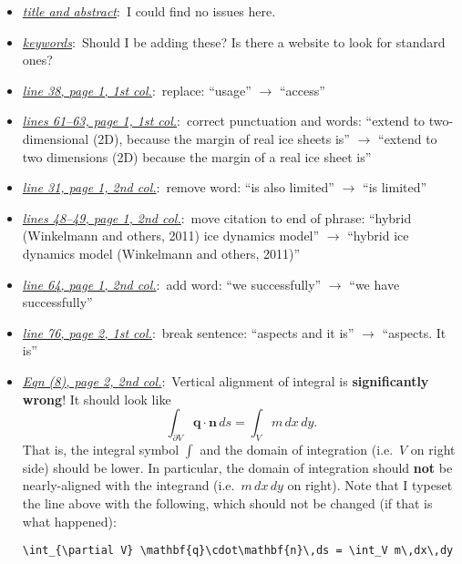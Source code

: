 \documentclass[11pt,reqno]{amsart}
\newcommand{\comm}[2]{\medskip \item[] \hspace{-0.5in}\underline{\emph{#1}}:\, #2}
\newcommand{\lnpagecol}[4]{\comm{line #1, page #2, #3 col.}{#4}}
\newcommand{\lnspagecol}[4]{\comm{lines #1, page #2, #3 col.}{#4}}
\newcommand{\eqnpagecol}[4]{\comm{Eqn #1, page #2, #3 col.}{#4}}
\begin{document}
\begin{itemize}
\comm{title and abstract}{I could find no issues here.}
\comm{keywords}{Should I be adding these?  Is there a website to look for standard ones?}
\lnpagecol{38}{1}{1st}{replace: ``usage'' $\to$ ``access''}
\lnspagecol{61--63}{1}{1st}{correct punctuation and words: ``extend to two-dimensional (2D), because the margin of real ice sheets is'' $\to$ ``extend to two dimensions (2D) because the margin of a real ice sheet is''}
\lnpagecol{31}{1}{2nd}{remove word:  ``is also limited'' $\to$ ``is limited''}
\lnspagecol{48--49}{1}{2nd}{move citation to end of phrase:  ``hybrid (Winkelmann and others, 2011) ice dynamics model'' $\to$ ``hybrid ice dynamics model (Winkelmann and others, 2011)''}
\lnpagecol{64}{1}{2nd}{add word: ``we successfully'' $\to$ ``we have successfully''}
\lnpagecol{76}{2}{1st}{break sentence: ``aspects and it is'' $\to$ ``aspects.  It is''}
\eqnpagecol{(8)}{2}{2nd}{Vertical alignment of integral is \textbf{significantly wrong}!  It should look like
   $$\int_{\partial V} \mathbf{q}\cdot\mathbf{n}\,ds = \int_V m\,dx\,dy.$$
That is, the integral symbol $\int$ and the domain of integration (i.e.~$V$ on right side) should be lower.  In particular, the domain of integration should \textbf{not} be nearly-aligned with the integrand (i.e.~$m\,dx\,dy$ on right).  Note that I typeset the line above with the following, which should not be changed (if that is what happened):}

\medskip
\begin{verbatim}
\int_{\partial V} \mathbf{q}\cdot\mathbf{n}\,ds = \int_V m\,dx\,dy
\end{verbatim}
\medskip


\end{itemize}
\end{document}
